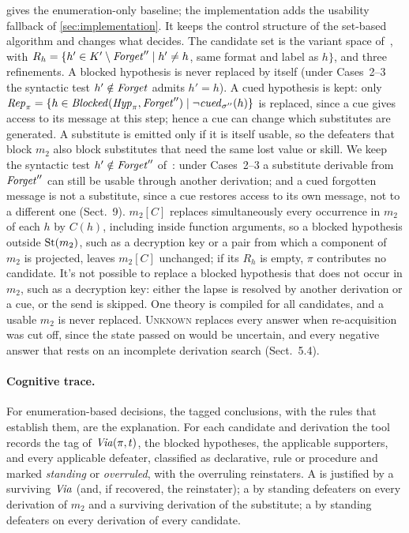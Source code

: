  gives the enumeration-only baseline; the implementation adds the usability fallback of \cref{sec:implementation}. It keeps the control structure of the set-based algorithm and changes what decides. The candidate set is the variant space of~\cite{sandu2026formal}, with $R_h=\{h'\in K'\setminus\mathit{Forget}''\mid h'\neq h$, same format and label as $h\}$, and three refinements. A blocked hypothesis is never replaced by itself (under Cases~2--3 the syntactic test $h'\notin\mathit{Forget}$ admits $h'=h$). A cued hypothesis is kept: only $\mathit{Rep}_\pi=\{h\in\mathit{Blocked}(\mathit{Hyp}_\pi,\mathit{Forget}'')\mid\neg\mathit{cued}_{\sigma''}(h)\}$ is replaced, since a cue gives access to its message at this step; hence a cue can change which substitutes are generated. A substitute is emitted only if it is itself usable, so the defeaters that block $m_2$ also block substitutes that need the same lost value or skill. We keep the syntactic test $h'\notin\mathit{Forget}''$ of~\cite{sandu2026formal}: under Cases~2--3 a substitute derivable from $\mathit{Forget}''$ can still be usable through another derivation; and a cued forgotten message is not a substitute, since a cue restores access to its own message, not to a different one (Sect.~9). $m_2[C]$ replaces simultaneously every occurrence in $m_2$ of each $h$ by $C(h)$, including inside function arguments, so a blocked hypothesis outside $\mathrm{St}(m_2)$, such as a decryption key or a pair from which a component of $m_2$ is projected, leaves $m_2[C]$ unchanged; if its $R_h$ is empty, $\pi$ contributes no candidate. It's not possible to replace a blocked hypothesis that does not occur in $m_2$, such as a decryption key: either the lapse is resolved by another derivation or a cue, or the send is skipped. One theory is compiled for all candidates, and a usable $m_2$ is never replaced. \textsc{Unknown} replaces every answer when re-acquisition was cut off, since the state passed on would be uncertain, and every negative answer that rests on an incomplete derivation search (Sect.~5.4).

\paragraph{Cognitive trace.} For enumeration-based decisions, the tagged conclusions, with the rules that establish them, are the explanation. For each candidate and derivation the tool records the tag of $\mathit{Via}(\pi,t)$, the blocked hypotheses, the applicable supporters, and every applicable defeater, classified as declarative, rule or procedure and marked \emph{standing} or \emph{overruled}, with the overruling reinstaters. A \preserve{} is justified by a surviving $\mathit{Via}$ (and, if recovered, the reinstater); a \replace{} by standing defeaters on every derivation of $m_2$ and a surviving derivation of the substitute; a \skipm{} by standing defeaters on every derivation of every candidate.
